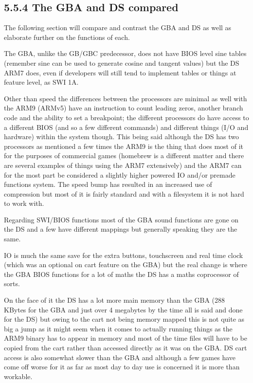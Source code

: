 \documentclass[
]{book}
\begin{document}
\hypertarget{the-gba-and-ds-compared}{%
\subsection{5.5.4 The GBA and DS compared}\label{the-gba-and-ds-compared}}

The following section will compare and contrast the GBA and DS as well as elaborate further on the functions of each.

The GBA, unlike the GB/GBC predecessor, does not have BIOS level sine tables (remember sine can be used to generate cosine and tangent values) but the DS ARM7 does, even if developers will still tend to implement tables or things at feature level, as SWI 1A.

Other than speed the differences between the processors are minimal as well with the ARM9 (ARMv5) have an instruction to count leading zeros, another branch code and the ability to set a breakpoint; the different processors do have access to a different BIOS (and so a few different commands) and different things (I/O and hardware) within the system though. This being said although the DS has two processors as mentioned a few times the ARM9 is the thing that does most of it for the purposes of commercial games (homebrew is a different matter and there are several examples of things using the ARM7 extensively) and the ARM7 can for the most part be considered a slightly higher powered IO and/or premade functions system. The speed bump has resulted in an increased use of compression but most of it is fairly standard and with a filesystem it is not hard to work with.

Regarding SWI/BIOS functions most of the GBA sound functions are gone on the DS and a few have different mappings but generally speaking they are the same.

IO is much the same save for the extra buttons, touchscreen and real time clock (which was an optional on cart feature on the GBA) but the real change is where the GBA BIOS functions for a lot of maths the DS has a maths coprocessor of sorts.

On the face of it the DS has a lot more main memory than the GBA (288 KBytes for the GBA and just over 4 megabytes by the time all is said and done for the DS) but owing to the cart not being memory mapped this is not quite as big a jump as it might seem when it comes to actually running things as the ARM9 binary has to appear in memory and most of the time files will have to be copied from the cart rather than accessed directly as it was on the GBA. DS cart access is also somewhat slower than the GBA and although a few games have come off worse for it as far as most day to day use is concerned it is more than workable.
\end{document}
